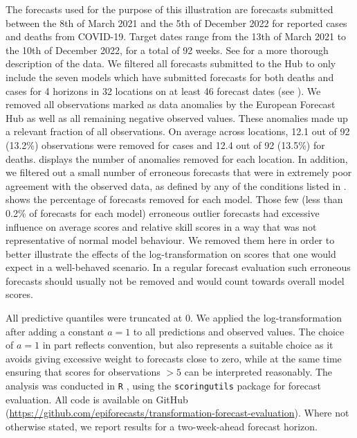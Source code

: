 \documentclass[10pt,letterpaper]{article}
\begin{document}
The forecasts used for the purpose of this illustration are forecasts submitted between the 8th of March 2021 and the 5th of December 2022 for reported cases and deaths from COVID-19. Target dates range from the 13th of March 2021 to the 10th of December 2022, for a total of 92 weeks. See \cite{sherrattPredictivePerformanceMultimodel2022} for a more thorough description of the data. We filtered all forecasts submitted to the Hub to only include the seven models which have submitted forecasts for both deaths and cases for 4 horizons in 32 locations on at least 46 forecast dates (see ). We removed all observations marked as data anomalies by the European Forecast Hub \cite{sherrattPredictivePerformanceMultimodel2022} as well as all remaining negative observed values. These anomalies made up a relevant fraction of all observations. On average across locations, 12.1 out of 92 (13.2\%) observations were removed for cases and 12.4 out of 92 (13.5\%) for deaths.  displays the number of anomalies removed for each location. In addition, we filtered out a small number of erroneous forecasts that were in extremely poor agreement with the observed data, as defined by any of the conditions listed in .  shows the percentage of forecasts removed for each model. Those few (less than 0.2\%  of forecasts for each model) erroneous outlier forecasts had excessive influence on average scores and relative skill scores in a way that was not representative of normal model behaviour. We removed them here in order to better illustrate the effects of the log-transformation on scores that one would expect in a well-behaved scenario. In a regular forecast evaluation such erroneous forecasts should usually not be removed and would count towards overall model scores. 

All predictive quantiles were truncated at 0. We applied the log-transformation after adding a constant $a = 1$ to all predictions and observed values. The choice of $a = 1$ in part reflects convention, but also represents a suitable choice as it avoids giving excessive weight to forecasts close to zero, while at the same time ensuring that scores for observations $> 5$ can be interpreted reasonably. The analysis was conducted in \texttt{R} \cite{R}, using the \texttt{scoringutils} package \cite{bosseEvaluatingForecastsScoringutils2022} for forecast evaluation. All code is available on GitHub 
(\url{https://github.com/epiforecasts/transformation-forecast-evaluation}). Where not otherwise stated, we report results for a two-week-ahead forecast horizon. 
\end{document}
